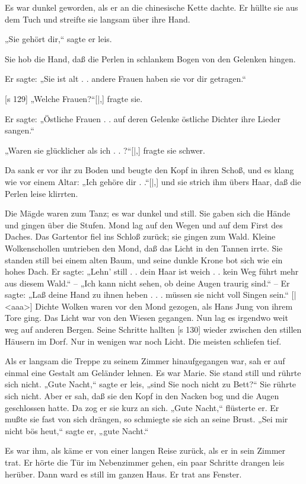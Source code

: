 Es war dunkel geworden, als er an die chinesische
Kette dachte. Er hüllte sie aus dem Tuch und streifte
sie langsam über ihre Hand.

„Sie gehört dir,“ sagte er leis.

Sie hob die Hand, daß die Perlen in schlankem
Bogen von den Gelenken hingen.

Er sagte: „Sie ist alt . . andere Frauen haben
sie vor dir getragen.“

[s 129]
„Welche Frauen?“[|,] fragte sie.

Er sagte: „Östliche Frauen . . auf deren Gelenke
östliche Dichter ihre Lieder sangen.“

„Waren sie glücklicher als ich . . ?“[|,] fragte sie
schwer.

Da sank er vor ihr zu Boden und beugte den
Kopf in ihren Schoß, und es klang wie vor einem
Altar: „Ich gehöre dir . .“[|,] und sie strich ihm übers
Haar, daß die Perlen leise klirrten.

Die Mägde waren zum Tanz; es war dunkel
und still. Sie gaben sich die Hände und gingen über
die Stufen. Mond lag auf den Wegen und auf dem
First des Daches. Das Gartentor fiel ins Schloß
zurück; sie gingen zum Wald. Kleine Wolkenschollen
umtrieben den Mond, daß das Licht in den Tannen
irrte. Sie standen still bei einem alten Baum, und
seine dunkle Krone bot sich wie ein hohes Dach.
Er sagte: „Lehn' still . . dein Haar ist weich . .
kein Weg führt mehr aus diesem Wald.“ – „Ich
kann nicht sehen, ob deine Augen traurig sind.“ –
Er sagte: „Laß deine Hand zu ihnen heben . . .
müssen sie nicht voll Singen sein.“
[|<aaa>]
Dichte Wolken waren vor den Mond gezogen,
als Hans Jung von ihrem Tore ging. Das Licht war
von den Wiesen gegangen. Nun lag es irgendwo
weit weg auf anderen Bergen. Seine Schritte hallten
[s 130]
wieder zwischen den stillen Häusern im Dorf. Nur
in wenigen war noch Licht. Die meisten schliefen tief.

Als er langsam die Treppe zu seinem Zimmer
hinaufgegangen war, sah er auf einmal eine Gestalt
am Geländer lehnen. Es war Marie. Sie stand
still und rührte sich nicht. „Gute Nacht,“ sagte er
leis, „sind Sie noch nicht zu Bett?“ Sie rührte sich
nicht. Aber er sah, daß sie den Kopf in den Nacken
bog und die Augen geschlossen hatte. Da zog er
sie kurz an sich. „Gute Nacht,“ flüsterte er. Er mußte
sie fast von sich drängen, so schmiegte sie sich an seine
Brust. „Sei mir nicht bös heut,“ sagte er, „gute Nacht.“

Es war ihm, als käme er von einer langen Reise
zurück, als er in sein Zimmer trat. Er hörte die
Tür im Nebenzimmer gehen, ein paar Schritte drangen
leis herüber. Dann ward es still im ganzen Haus.
Er trat ans Fenster.

